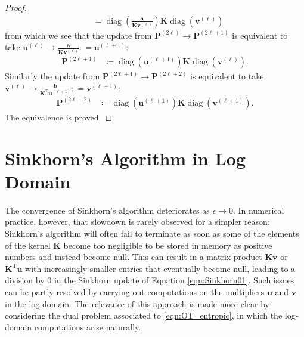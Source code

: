 \documentclass[11pt]{book}
\begin{document}
\begin{proof}
\begin{align*}
    & = \operatorname{diag}\left(\frac{\mathbf{a}}{ \mathbf{K} \mathbf{v}^{(\ell)}  }\right) \mathbf{K} \operatorname{diag}(\mathbf{v}^{(\ell)})
\end{align*}
from which we see that the update from $\mathbf{P}^{(2\ell)} \rightarrow \mathbf{P}^{(2\ell+1)}$ is equivalent to take $\mathbf{u}^{(\ell)} \rightarrow \frac{\mathbf{a}}{ \mathbf{K} \mathbf{v}^{(\ell)} }: = \mathbf{u}^{(\ell+1)}$:
\begin{align*}
    \mathbf{P}^{(2\ell+1)} &\coloneqq \operatorname{diag}(\mathbf{u}^{(\ell+1)}) \mathbf{K} \operatorname{diag}(\mathbf{v}^{(\ell)}).
\end{align*}
Similarly the update from $\mathbf{P}^{(2\ell+1)} \rightarrow \mathbf{P}^{(2\ell+2)}$ is equivalent to take $\mathbf{v}^{(\ell)} \rightarrow \frac{\mathbf{b}}{ \mathbf{K}^{\mathrm{T}} \mathbf{u}^{(\ell+1)} }: = \mathbf{v}^{(\ell+1)}$:
\begin{align*}
    \mathbf{P}^{(2\ell+2)} &\coloneqq \operatorname{diag}(\mathbf{u}^{(\ell+1)}) \mathbf{K} \operatorname{diag}(\mathbf{v}^{(\ell+1)}).
\end{align*}
The equivalence is proved.
\end{proof}








\section[Sinkhorn in Log-Domain]{Sinkhorn's Algorithm in Log Domain}


The convergence of Sinkhorn's algorithm deteriorates as $\epsilon \to 0$. In numerical practice, however, that slowdown is rarely observed for a simpler reason: Sinkhorn's algorithm will often fail to terminate as soon as some of the elements of the kernel $\mathbf{K}$ become too negligible to be stored in memory as positive numbers and instead become null. This can result in a matrix product $\mathbf{K} \mathbf{v}$ or $\mathbf{K}^\mathrm{T} \mathbf{u}$ with increasingly smaller entries that eventually become null, leading to a division by $0$ in the Sinkhorn update of Equation \eqref{eqn:Sinkhorn01}. Such issues can be partly resolved by carrying out computations on the multipliers $\mathbf{u}$ and $\mathbf{v}$ in the log domain. The relevance of this approach is made more clear by considering the dual problem associated to \eqref{eqn:OT_entropic}, in which the log-domain computations arise naturally.
    
\end{document}

